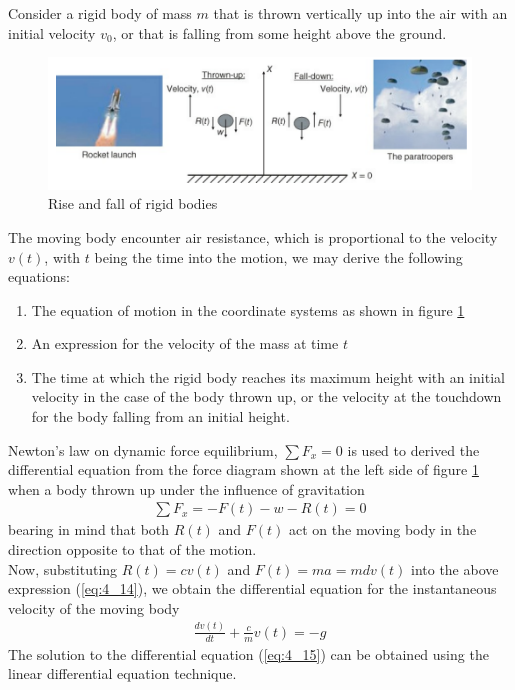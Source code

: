 \documentclass[11pt]{report}
\newcommand{\sps}{\\[0.2cm]}
\newcommand{\refn}[1]{(\ref{#1})}
\newcommand{\refx}[1]{\refn{eq:#1}}
\newcommand{\NI}{\noindent}
\renewcommand{\labelenumi}{\arabic{enumi})}
\begin{document}
	\NI Consider a rigid body of mass $m$ that is thrown vertically up into the air with an initial velocity $v_0$, or that is falling from some height above the ground. 
	\begin{figure}[h!]
		\centering
		\includegraphics[width=0.9\linewidth]{rigid}
		\caption{Rise and fall of rigid bodies}
		\label{fig:4_2}
	\end{figure}
	The moving body encounter air resistance, which is proportional to the velocity $v(t)$, with $t$ being the time into the motion, we may derive the following equations:
	\begin{enumerate}
		\renewcommand{\labelenumi}{\alph{enumi}}
		\item The equation of motion in the coordinate systems as shown in figure \ref{fig:4_2}
		\item An expression for the velocity of the mass at time $t$
		\item The time at which the rigid body reaches its maximum height with an initial velocity in the case of the body thrown up, or the velocity at the touchdown for the body falling from an initial height.
	\end{enumerate}
	Newton's law on dynamic force equilibrium, $\sum F_x = 0$ is used to derived the differential equation from the force diagram shown at the left side of figure \ref{fig:4_2} when a body thrown up under the influence of gravitation
	\begin{eqnarray}
		\sum F_x = -F(t) - w - R(t) = 0\label{eq:4_14}
	\end{eqnarray}
	bearing in mind that both $R(t)$ and $F(t)$ act on the moving body in the direction opposite to that of the motion.\sps
	Now, substituting $R(t) = cv(t)$ and $F(t)=ma=mdv(t)$ into the above expression \refx{4_14}, we obtain the differential equation for the instantaneous velocity of the moving body
	\begin{eqnarray}
		\frac{dv(t)}{dt} + \frac{c}{m}v(t) = -g\label{eq:4_15}
	\end{eqnarray}
	The solution to the differential equation \refx{4_15} can be obtained using the linear differential equation technique.
	
\end{document}

